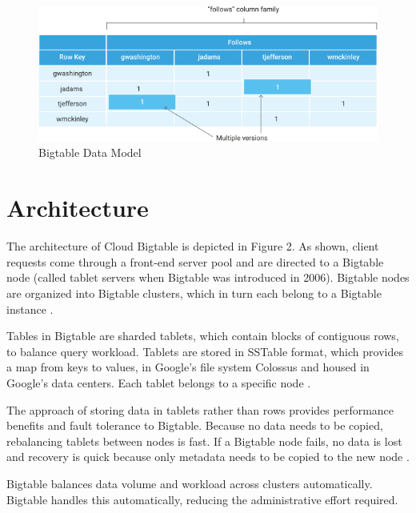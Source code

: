 \documentclass[9pt,twocolumn,twoside]{styles/osajnl}
\begin{document}
\begin{figure}[ht]
  \includegraphics[scale=0.45]{images/bigtable-example.jpg}
  \caption{Bigtable Data Model \cite{www-bigtabledocoverview}}
\end{figure}

\section{Architecture}

The architecture of Cloud Bigtable is depicted in Figure 2.  As shown, client requests come through a front-end server pool and are directed to a Bigtable node (called tablet servers when Bigtable was introduced in 2006). Bigtable nodes are organized into Bigtable clusters, which in turn each belong to a Bigtable instance \cite{www-bigtabledocoverview}.

Tables in Bigtable are sharded tablets, which contain blocks of contiguous rows, to balance query workload. Tablets are stored in SSTable format, which provides a map from keys to values, in Google's file system Colossus and housed in Google's data centers. Each tablet belongs to a specific node \cite{www-bigtabledocoverview}.

The approach of storing data in tablets rather than rows provides performance benefits and fault tolerance to Bigtable. Because no data needs to be copied, rebalancing tablets between nodes is fast. If a Bigtable node fails, no data is lost and recovery is quick because only metadata needs to be copied to the new node  \cite{www-bigtabledocoverview}.

Bigtable balances data volume and workload across clusters automatically. Bigtable handles this automatically, reducing the administrative effort required\cite{www-bigtabledocoverview}.


\end{document}
